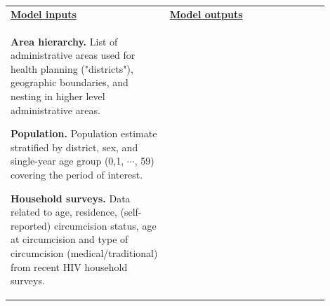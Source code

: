 \documentclass{article}
\begin{document}
\begin{appendix}
{\begin{table}[H]
\begin{tabular}{| p{0.45\linewidth} | p{0.45\linewidth} |}
			\textbf{\underline{Model inputs}} & \textbf{\underline{Model outputs}} \\
			
			{\bf Area hierarchy.} List of administrative areas used for health planning ("districts"), geographic boundaries, and nesting in higher level administrative areas.
			\vspace{5pt}
			
			{\bf Population.} Population estimate stratified by district, sex, and single-year age group (0,1, $\cdots$, 59) covering the period of interest. 
			\vspace{5pt}
			
			{\bf Household surveys.} Data related to age, residence, (self-reported) circumcision status, age at circumcision and type of circumcision (medical/traditional) from recent HIV household surveys. 
			

\end{tabular}
\end{table}}
\end{appendix}
\end{document}
